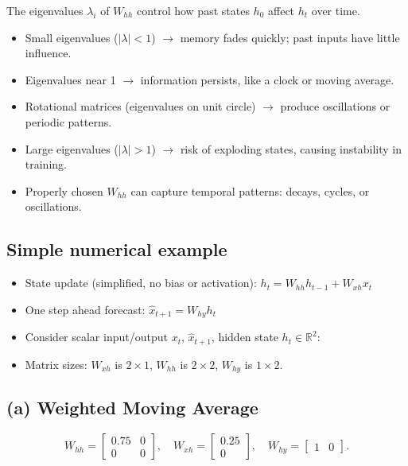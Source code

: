 \documentclass[
]{article}
\providecommand{\tightlist}{%
  \setlength{\itemsep}{0pt}\setlength{\parskip}{0pt}}
\begin{document}
The eigenvalues \(\lambda_i\) of \(W_{hh}\) control how past states
\(h_0\) affect \(h_t\) over time.

\begin{itemize}
\tightlist
\item
  Small eigenvalues (\(|\lambda| < 1\)) \(\to\) memory fades quickly;
  past inputs have little influence.
\item
  Eigenvalues near 1 \(\to\) information persists, like a clock or
  moving average.
\item
  Rotational matrices (eigenvalues on unit circle) \(\to\) produce
  oscillations or periodic patterns.
\item
  Large eigenvalues (\(|\lambda| > 1\)) \(\to\) risk of exploding
  states, causing instability in training.
\item
  Properly chosen \(W_{hh}\) can capture temporal patterns: decays,
  cycles, or oscillations.
\end{itemize}

\subsection{Simple numerical example}\label{simple-numerical-example}

\begin{itemize}
\tightlist
\item
  State update (simplified, no bias or activation):
  \(h_t = W_{hh}h_{t-1} + W_{xh}x_t\)
\item
  One step ahead forecast: \(\hat{x}_{t+1} = W_{hy}h_t\)
\item
  Consider scalar input/output \(x_t\), \(\hat{x}_{t+1}\), hidden state
  \(h_t \in \mathbb{R}^2\):
\item
  Matrix sizes: \(W_{xh}\) is \(2\times 1\), \(W_{hh}\) is
  \(2\times 2\), \(W_{hy}\) is \(1\times 2\).
\end{itemize}

\subsection{(a) Weighted Moving
Average}\label{a-weighted-moving-average}

\[W_{hh}=\begin{bmatrix}0.75 & 0\\ 0 & 0\end{bmatrix},\quad
W_{xh}=\begin{bmatrix}0.25\\ 0\end{bmatrix},\quad
W_{hy}=\begin{bmatrix}1 & 0\end{bmatrix}.\]
\end{document}
